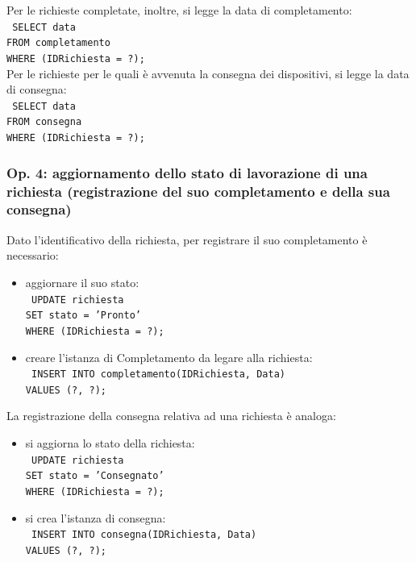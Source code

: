 \documentclass[a4paper,12pt]{report}
\begin{document}
\noindent Per le richieste completate, inoltre, si legge la data di completamento: \\
\texttt{
SELECT data \\
FROM completamento \\
WHERE (IDRichiesta = ?);
} \\

\noindent Per le richieste per le quali è avvenuta la consegna dei dispositivi, si legge la data di consegna: \\
\texttt{
SELECT data \\
FROM consegna \\
WHERE (IDRichiesta = ?);
}

\subsubsection{Op. 4: aggiornamento dello stato di lavorazione di una richiesta (registrazione del suo completamento e della sua consegna)}

Dato l'identificativo della richiesta, per registrare il suo completamento è necessario:
\begin{itemize}
    \item aggiornare il suo stato: \\
    \texttt{
    UPDATE richiesta \\
    SET stato = 'Pronto' \\
    WHERE (IDRichiesta = ?);
    }
    \item creare l'istanza di Completamento da legare alla richiesta: \\
    \texttt{
    INSERT INTO completamento(IDRichiesta, Data) \\
    VALUES (?, ?);
    }
\end{itemize}

\noindent La registrazione della consegna relativa ad una richiesta è analoga:
\begin{itemize}
    \item si aggiorna lo stato della richiesta: \\
    \texttt{
    UPDATE richiesta \\
    SET stato = 'Consegnato' \\
    WHERE (IDRichiesta = ?);
    }
    \item si crea l'istanza di consegna: \\
    \texttt{
    INSERT INTO consegna(IDRichiesta, Data) \\
    VALUES (?, ?);
    }
\end{itemize}
\end{document}
